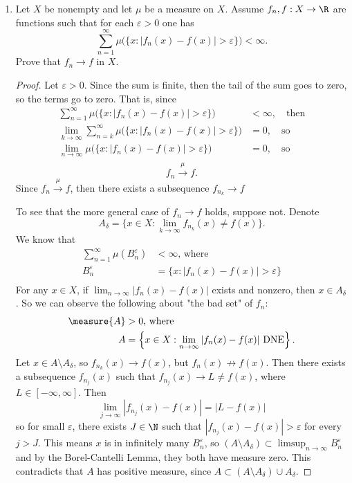 \documentclass[12pt,letterpaper]{article}
\begin{document}
\begin{enumerate}
\pagebreak
\item Let $X$ be nonempty and let $\mu$ be a measure on $X$. Assume $f_n, f : X \to \R$ are \mumeasurable{}	functions such that for each $\varepsilon > 0$ one has
$$\sum_{n=1}^\infty \mu\big(\{x: |f_n(x)- f(x)|>\varepsilon\}\big)<\infty.$$
Prove that $f_n\to f$ \muae{} in $X$. 
\begin{proof}
Let $\varepsilon>0$.	Since the sum is finite, then the tail of the sum goes to zero, so the terms go to zero. That is, since 
\begin{align*}
\sum_{n=1}^\infty \mu\big(\{x: |f_n(x)- f(x)|>\varepsilon\}\big)&<\infty, \quad \text{then}\\
\lim_{k\to\infty} \sum_{n=k}^\infty \mu\big(\{x: |f_n(x)- f(x)|>\varepsilon\}\big)&=0, \quad \text{so}\\
\lim_{n\to\infty} \mu\big(\{x: |f_n(x)- f(x)|>\varepsilon\}\big)&=0, \quad \text{so}\\
\end{align*}
\vspace{-32pt}
$$f_n\xrightarrow{\mu}f. $$
Since $f_n\xrightarrow{\mu}f$, then there exists a subsequence $f_{n_k}\to f$ \muae{} 

To see that the more general case of $f_n\to f$ \muae{} holds, suppose not. Denote
$$A_\delta = \{x\in X : \lim_{k\to\infty} f_{n_k}(x) \neq f(x)\}.$$
We know that 
\begin{align*}
\sum_{n=1}^\infty \mu (B^\varepsilon_n )&<\infty \text{, where}\\
B^\varepsilon_n &= \{x: |f_n(x)- f(x)|>\varepsilon\}\\
\end{align*}
For any $x\in X$, if $\lim_{n\to\infty}|f_n(x)-f(x)|$ exists and nonzero, then $x\in A_\delta$. So we can observe the following about "the bad set" of $f_n$:
\begin{align*}
\measure{A} &> 0 \text{, where }  \\
A &= \left\lbrace x\in X : \lim_{n\to\infty}|f_n(x)-f(x)| \text{ DNE}\right\rbrace.
\end{align*}
Let $x\in A\setminus A_\delta$, so $f_{n_k}(x)\to f(x)$, but $f_{n}(x)\not\to f(x)$. Then there exists a subsequence $f_{n_j}(x)$ such that $f_{n_j}(x)\to L\neq f(x)$, where $L\in[-\infty,\infty]$. Then 
$$\lim_{j\to\infty}|f_{n_j}(x)-f(x)|=|L-f(x)|$$
so for small $\varepsilon$, there exists $J\in\N$ such that $|f_{n_j}(x)-f(x)|>\varepsilon$ for every $j>J$. This means $x$ is in infinitely many $B^\varepsilon_n$, so $(A\setminus A_\delta)\subset \limsup_{n\to\infty} B^\varepsilon_n$ and by the Borel-Cantelli Lemma, they both have measure zero. This contradicts that $A$ has positive measure, 
since $A\subset (A\setminus A_\delta) \cup A_\delta$. \qedhere



\end{proof}
\end{enumerate}
\end{document}

